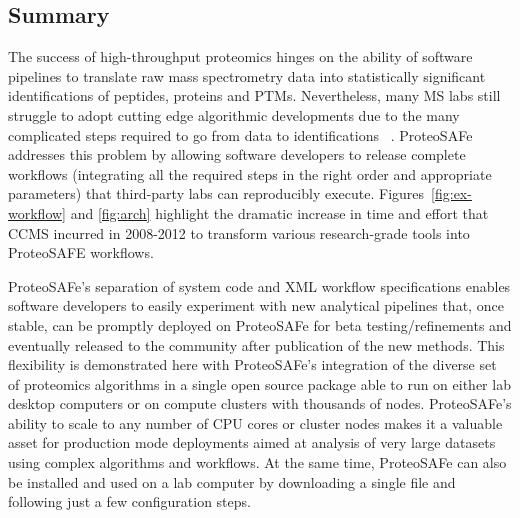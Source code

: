 \documentclass[arial,11pt]{article}
\newcommand{\SF}[1]{\textsf{#1}}
\newcommand{\SYSTEM}[0]{\SF{ProteoSAFe}\xspace}
\begin{document}
\subsection{Summary}

The success of high-throughput proteomics hinges on the ability of software pipelines to translate raw mass spectrometry data into statistically significant identifications of peptides, proteins and PTMs. Nevertheless, many MS labs still struggle to adopt cutting edge algorithmic developments due to the many complicated steps required to go from data to identifications~\cite{Bell:2009} . \SYSTEM addresses this problem by allowing software developers to release complete workflows (integrating all the required steps in the right order and appropriate parameters) that third-party labs can reproducibly execute.
Figures~\ref{fig:ex-workflow} and \ref{fig:arch} highlight the dramatic increase in time and effort that CCMS  incurred  in 2008-2012 to transform various research-grade tools into ProteoSAFE workflows.

\SYSTEM's separation of system code and XML workflow specifications enables software developers to easily experiment with new analytical pipelines that, once stable, can be promptly deployed on \SYSTEM for beta testing/refinements and eventually  released to the community after publication of the new methods. This flexibility is demonstrated here with \SYSTEM's integration of
 the  diverse set of proteomics algorithms in a single open source package able to run on either lab desktop computers or on compute clusters with thousands of nodes. \SYSTEM's ability to  scale to any number of CPU cores or cluster nodes makes it a valuable asset for production mode deployments aimed at analysis of very large datasets using complex algorithms and workflows.
At the same time, \SYSTEM can also be installed and used on a lab computer by downloading a single file and following just a few configuration steps.
\end{document}
